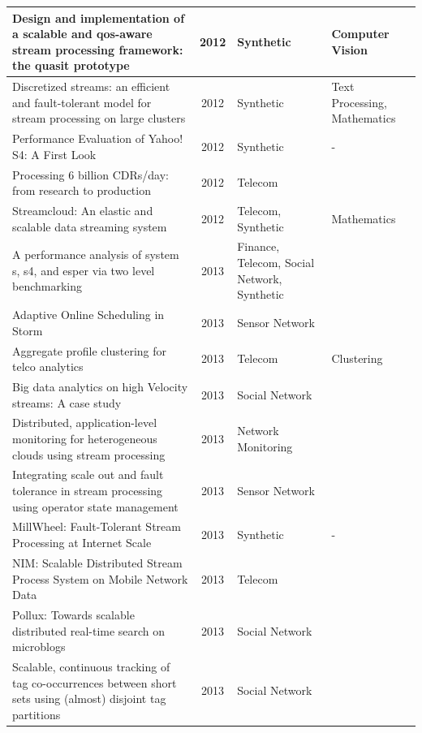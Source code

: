 \documentclass[ppgc,diss,english]{iiufrgs}
\begin{document}
\begin{center}
\begin{longtable}{ | p{8cm} | c | p{3cm} | p{2.5cm} |}
		Design and implementation of a scalable and qos-aware stream processing framework: the quasit prototype \cite{bellavista2012design} & 2012 & Synthetic & Computer Vision \\\hline
		Discretized streams: an efficient and fault-tolerant model for stream processing on large clusters \cite{zaharia2012discretized} & 2012 & Synthetic & Text Processing, Mathematics \\\hline
		Performance Evaluation of Yahoo! S4: A First Look \cite{chauhan2012performance} & 2012 & Synthetic & - \\\hline
		Processing 6 billion CDRs/day: from research to production \cite{bouillet2012processing} & 2012 & Telecom & \\\hline
		Streamcloud: An elastic and scalable data streaming system \cite{gulisano2012streamcloud} & 2012 & Telecom, Synthetic & Mathematics \\\hline
		A performance analysis of system s, s4, and esper via two level benchmarking \cite{dayarathna2013performance} & 2013 & Finance, Telecom, Social Network, Synthetic & \\\hline
		Adaptive Online Scheduling in Storm \cite{aniello2013adaptive} & 2013 & Sensor Network & \\\hline
		Aggregate profile clustering for telco analytics \cite{abbasouglu2013aggregate} & 2013 & Telecom & Clustering \\\hline
		Big data analytics on high Velocity streams: A case study \cite{chardonnens2013big} & 2013 & Social Network & \\\hline
		Distributed, application-level monitoring for heterogeneous clouds using stream processing \cite{smit2013distributed} & 2013 & Network Monitoring & \\\hline
		Integrating scale out and fault tolerance in stream processing using operator state management \cite{CastroFernandez:2013:ISO:2463676.2465282} & 2013 & Sensor Network & \\\hline
		MillWheel: Fault-Tolerant Stream Processing at Internet Scale \cite{akidau2013millwheel} & 2013 & Synthetic & - \\\hline
		NIM: Scalable Distributed Stream Process System on Mobile Network Data \cite{pan2013nim} & 2013 & Telecom & \\\hline
		Pollux: Towards scalable distributed real-time search on microblogs \cite{lin2013pollux} & 2013 & Social Network & \\\hline
		Scalable, continuous tracking of tag co-occurrences between short sets using (almost) disjoint tag partitions \cite{alvanaki2013scalable} & 2013 & Social Network & \\\hline

\end{longtable}
\end{center}
\end{document}
